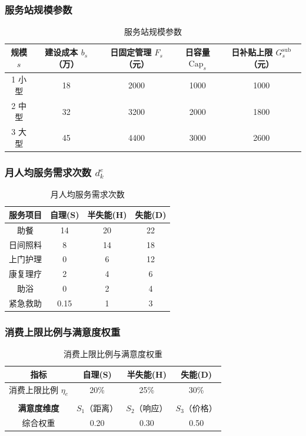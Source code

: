 \documentclass[UTF8]{ctexart}
\begin{document}
\subsubsection{服务站规模参数}

\begin{table}[H]
\centering
\caption{服务站规模参数}
\renewcommand{\arraystretch}{1.3}
\begin{tabular}{|c|c|c|c|c|}
\hline
\textbf{规模 $s$} & \textbf{建设成本 $b_s$（万）} & \textbf{日固定管理 $F_s$（元）} & \textbf{日容量 $\text{Cap}_s$} & \textbf{日补贴上限 $G_s^{\text{sub}}$（元）} \\
\hline
1 小型 & 18 & 2000 & 1000 & 1000 \\
\hline
2 中型 & 32 & 3200 & 2000 & 1800 \\
\hline
3 大型 & 45 & 4400 & 3000 & 2600 \\
\hline
\end{tabular}
\end{table}

\subsubsection{月人均服务需求次数 $d_k^e$}

\begin{table}[H]
\centering
\caption{月人均服务需求次数}
\renewcommand{\arraystretch}{1.3}
\begin{tabular}{|c|c|c|c|}
\hline
\textbf{服务项目} & \textbf{自理(S)} & \textbf{半失能(H)} & \textbf{失能(D)} \\
\hline
助餐 & 14 & 20 & 22 \\
\hline
日间照料 & 8 & 14 & 18 \\
\hline
上门护理 & 0 & 6 & 12 \\
\hline
康复理疗 & 2 & 4 & 6 \\
\hline
助浴 & 0 & 2 & 4 \\
\hline
紧急救助 & 0.15 & 1 & 3 \\
\hline
\end{tabular}
\end{table}

\subsubsection{消费上限比例与满意度权重}

\begin{table}[H]
\centering
\caption{消费上限比例与满意度权重}
\renewcommand{\arraystretch}{1.3}
\begin{tabular}{|c|c|c|c|}
\hline
\textbf{指标} & \textbf{自理(S)} & \textbf{半失能(H)} & \textbf{失能(D)} \\
\hline
消费上限比例 $\eta_e$ & 20\% & 25\% & 30\% \\
\hline
& & & \\
\hline
\textbf{满意度维度} & $S_1$（距离） & $S_2$（响应） & $S_3$（价格） \\
\hline
综合权重 & 0.20 & 0.30 & 0.50 \\
\hline
\end{tabular}
\end{table}
\end{document}
